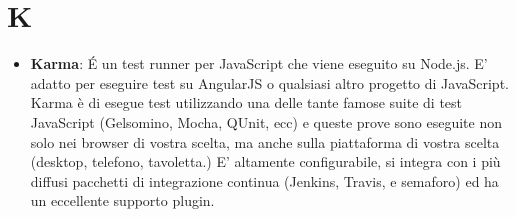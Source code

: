\section{K}
\begin{itemize} 
	\item
	\textbf{Karma}: É un test runner per JavaScript che viene eseguito su Node.js. E' adatto per eseguire test su AngularJS o qualsiasi altro progetto di JavaScript. Karma è di esegue test utilizzando una delle tante famose suite di test JavaScript (Gelsomino, Mocha, QUnit, ecc) e queste prove sono eseguite non solo nei browser di vostra scelta, ma anche sulla piattaforma di vostra scelta (desktop, telefono, tavoletta.) E' altamente configurabile, si integra con i più diffusi pacchetti di integrazione continua (Jenkins, Travis, e semaforo) ed ha un eccellente supporto plugin.
\end{itemize}
